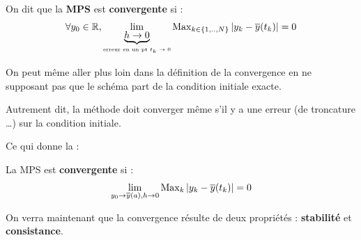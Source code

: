 \begin{fdef}
    On dit que la \textbf{MPS} est \textbf{convergente} si :
\[
    \forall y_0 \in \mathbb{R}, \lim_{\underbrace{h\to0}_{\text{erreur en un pt $t_k \to 0$}}} \operatorname{Max}_{k\in\{1,..,N\}} \left\lvert y_k - \overline{y}(t_k)\right\rvert = 0
\]
\label{eqdiff:def1}
\end{fdef}

\begin{remark}
    On peut même aller plus loin dans la définition de la convergence en
    ne supposant pas que le schéma part de la condition initiale exacte.

    Autrement dit, la méthode doit converger même s'il y a une erreur
    (de troncature \dots) sur la condition initiale.

    Ce qui donne la :
\end{remark}

\begin{fdef}
    La MPS est \textbf{convergente} si :
    \[
        \lim_{y_0\to\overline{y}(a), h\to0} \operatorname{Max}_k \left\lvert y_k - \overline{y}(t_k)\right\rvert = 0
    \]
    \label{eqdiff:def2}
\end{fdef}

On verra maintenant que la convergence résulte de deux propriétés :
\textbf{stabilité} et \textbf{consistance}.

